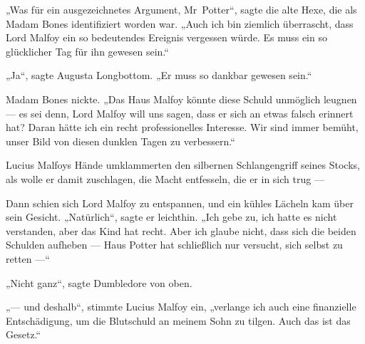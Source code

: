 „Was für ein ausgezeichnetes Argument, Mr~Potter“, sagte die alte Hexe, die als Madam Bones identifiziert worden war.
„Auch ich bin ziemlich überrascht, dass Lord Malfoy ein so bedeutendes Ereignis vergessen würde. Es muss ein so glücklicher Tag für ihn gewesen sein.“

„Ja“, sagte Augusta Longbottom.
„Er muss so dankbar gewesen sein.“

Madam Bones nickte.
„Das Haus Malfoy könnte diese Schuld unmöglich leugnen — es sei denn, Lord Malfoy will uns sagen, dass er sich an etwas falsch erinnert hat? Daran hätte ich ein recht professionelles Interesse. Wir sind immer bemüht, unser Bild von diesen dunklen Tagen zu verbessern.“

Lucius Malfoys Hände umklammerten den silbernen Schlangengriff seines Stocks, als wolle er damit zuschlagen, die Macht entfesseln, die er in sich trug —

Dann schien sich Lord Malfoy zu entspannen, und ein kühles Lächeln kam über sein Gesicht.
„Natürlich“, sagte er leichthin.
„Ich gebe zu, ich hatte es nicht verstanden, aber das Kind hat recht. Aber ich glaube nicht, dass sich die beiden Schulden aufheben — Haus Potter hat schließlich nur versucht, sich selbst zu retten —“

„Nicht ganz“, sagte Dumbledore von oben.

„— und deshalb“, stimmte Lucius Malfoy ein, „verlange ich auch eine finanzielle Entschädigung, um die Blutschuld an meinem Sohn zu tilgen. Auch das ist das Gesetz.“

